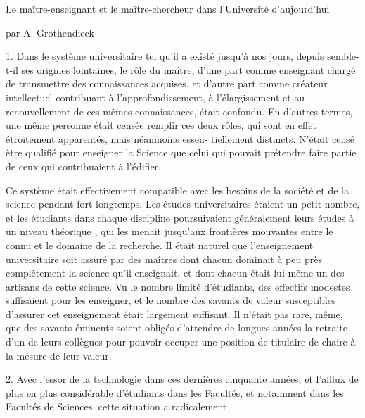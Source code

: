 
Le maître-enseignant et le maître-chercheur dans
l'Université d'aujourd'hui 

par A. Grothendieck


1. Dans le système universitaire tel qu'il a existé jusqu'à nos jours,
depuis semble-t-il ses origines lointaines, le rôle du maître, d'une part
comme enseignant chargé de transmettre des connaissances acquises, et
d'autre part comme créateur intellectuel contribuant à l'approfondissement,
à l'élargissement et au renouvellement de ces mêmes connaissances, était
confondu. En d'autres termes, une même personne était censée remplir ces
deux rôles, qui sont en effet étroitement apparentés, mais néanmoins essen-%
tiellement distincts. N'était censé être qualifié pour enseigner la Science
que celui qui pouvait prétendre faire partie de ceux qui contribuaient à
l'édifier.

Ce système était effectivement compatible avec les besoins de la
société et de la science pendant fort longtemps. Les études universitaires
étaient  un petit nombre, et les étudiants dans chaque discipline
poursuivaient généralement leurs études à un niveau théorique , qui
les menait jusqu'aux frontières mouvantes entre le connu et le domaine de
la recherche. Il était naturel que l'enseignement universitaire soit assuré
par des maîtres dont chacun dominait à peu près complètement la science qu'il
enseignait, et dont chacun était lui-même un des artisans de cette science.
Vu le nombre limité d'étudiants, des effectifs modestes suffisaient pour
les enseigner, et le nombre des savants de valeur susceptibles d'assurer
cet enseignement était largement suffisant. Il n'était pas rare, même, que
des savants éminents soient obligés d'attendre de longues années la retraite
d'un de leurs collègues pour pouvoir occuper une position de titulaire de
chaire à la mesure de leur valeur.

2. Avec l'essor de la technologie dans ces dernières cinquante années, et
l'afflux de plus en plus considérable d'étudiants dans les Facultés, et
notamment dans les Facultés de Sciences, cette situation a radicalement

